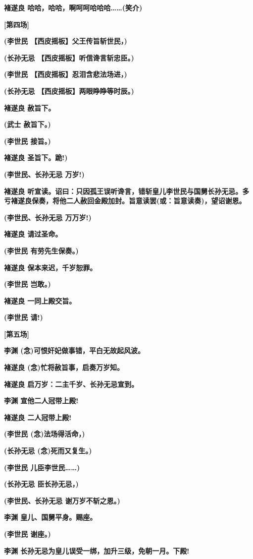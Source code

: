 \textbf{褚遂良 哈哈，哈哈，啊呵呵哈哈哈\ldots{}\ldots{}(笑介)}

\textbf{{[}第四场{]}}

\textbf{(李世民 【西皮摇板】父王传旨斩世民，)}

\textbf{(长孙无忌 【西皮摇板】听信谗言斩忠臣。)}

\textbf{(李世民 【西皮摇板】忍泪含悲法场进，)}

\textbf{(长孙无忌 【西皮摇板】两眼睁睁等时辰。)}

\textbf{褚遂良 赦旨下。}

\textbf{(武士 赦旨下。)}

\textbf{(李世民 接旨。)}

\textbf{褚遂良 圣旨下。跪!)}

\textbf{(李世民、长孙无忌 万岁!)}

\textbf{褚遂良
听宣读。诏曰：只因孤王误听谗言，错斩皇儿李世民与国舅长孙无忌。多亏褚遂良保奏，将他二人赦回金殿加封。旨意读罢(或：旨意读奏)，望诏谢恩。}

\textbf{(李世民、长孙无忌 万万岁!)}

\textbf{褚遂良 请过圣命。}

\textbf{(李世民 有劳先生保奏。)}

\textbf{褚遂良 保本来迟，千岁恕罪。}

\textbf{(李世民 岂敢。)}

\textbf{褚遂良 一同上殿交旨。}

\textbf{(李世民 请!)}

\textbf{{[}第五场{]}}

\textbf{李渊 (念)可恨奸妃做事错，平白无故起风波。}

\textbf{褚遂良 (念)忙将赦旨事，启奏万岁知。}

\textbf{褚遂良 启万岁：二主千岁、长孙无忌宣到。}

\textbf{李渊 宣他二人冠带上殿!}

\textbf{褚遂良 二人冠带上殿!}

\textbf{(李世民 (念)法场得活命，)}

\textbf{(长孙无忌 (念)死而又复生。)}

\textbf{(李世民 儿臣李世民\ldots{}\ldots{})}

\textbf{(长孙无忌 臣长孙无忌，)}

\textbf{(李世民、长孙无忌 谢万岁不斩之恩。)}

\textbf{李渊 皇儿、国舅平身。赐座。}

\textbf{(李世民 谢座。)}

\textbf{李渊 长孙无忌为皇儿误受一绑，加升三级，免朝一月。下殿!}

